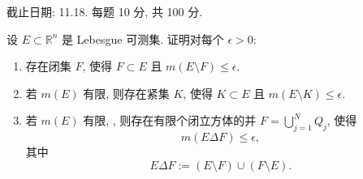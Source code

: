 \documentclass{article}
\begin{document}
截止日期: 11.18. 每题 10 分, 共 100 分.

\begin{problem}
  设 $E\subset\mathbb{R}^n$ 是 Lebesgue 可测集. 证明对每个 $\epsilon>0$:
  \begin{enumerate}
    \item[(a)] 存在闭集 $F$, 使得 $F\subset E$ 且 $m(E\setminus F)\leq\epsilon$.
    \item[(b)] 若 $m(E)$ 有限, 则存在紧集 $K$, 使得 $K\subset E$ 且 $m(E\setminus K)\leq\epsilon$.
    \item[(c)] 若 $m(E)$ 有限, , 则存在有限个闭立方体的并 $F=\bigcup_{j=1}^N Q_j$, 使得
      \[
        m(E\Delta F)\leq\epsilon,
      \]
      其中
      \[
        E\Delta F:=(E\setminus F)\cup(F\setminus E).
      \]
  \end{enumerate}
\end{problem}
\end{document}
